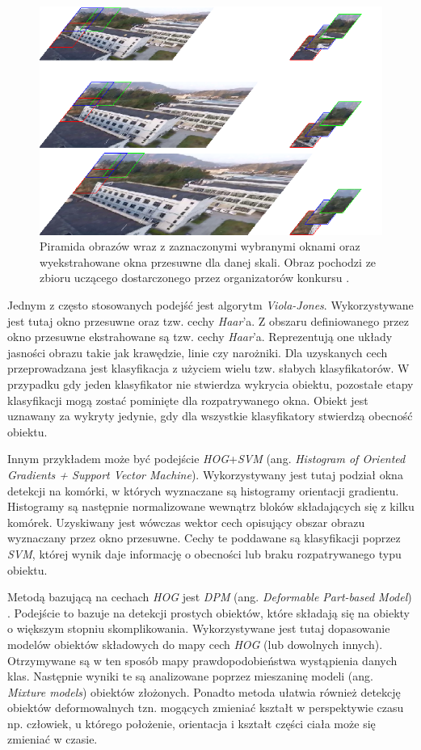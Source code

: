 \begin{figure}
    \centering
    \includegraphics[width=0.9\linewidth]{images/piramid.png}
    \caption{Piramida obrazów wraz z zaznaczonymi wybranymi oknami oraz wyekstrahowane okna przesuwne dla danej skali. Obraz pochodzi ze zbioru uczącego dostarczonego przez organizatorów konkursu \cite{dac_sdc_2021}.}
    \label{fig:sliding_window}
\end{figure}


Jednym z często stosowanych podejść jest algorytm \emph{Viola-Jones}\cite{viola_jones}. 
Wykorzystywane jest tutaj okno przesuwne oraz tzw. cechy \emph{Haar}'a.
Z obszaru definiowanego przez okno przesuwne ekstrahowane są tzw. cechy \emph{Haar}'a.
Reprezentują one układy jasności obrazu takie jak krawędzie, linie czy narożniki. 
Dla uzyskanych cech przeprowadzana jest klasyfikacja z użyciem wielu tzw. słabych klasyfikatorów.
W przypadku gdy jeden klasyfikator nie stwierdza wykrycia obiektu, pozostałe etapy klasyfikacji mogą zostać pominięte dla rozpatrywanego okna.
Obiekt jest uznawany za wykryty jedynie, gdy dla wszystkie klasyfikatory stwierdzą obecność obiektu. 

Innym przykładem może być podejście \emph{HOG}+\emph{SVM}\cite{hog} (ang. \emph{Histogram of Oriented Gradients + Support Vector Machine}). 
Wykorzystywany jest tutaj podział okna detekcji na komórki, w których wyznaczane są histogramy orientacji gradientu. 
Histogramy są następnie normalizowane wewnątrz bloków składających się z kilku komórek. 
Uzyskiwany jest wówczas wektor cech opisujący obszar obrazu wyznaczany przez okno przesuwne. 
Cechy te poddawane są klasyfikacji poprzez \emph{SVM}, której wynik daje informację o obecności lub braku rozpatrywanego typu obiektu.

Metodą bazującą na cechach \emph{HOG} jest \emph{DPM} (ang. \emph{Deformable Part-based Model}) \cite{model_based}.
Podejście to bazuje na detekcji prostych obiektów, które składają się na obiekty o większym stopniu skomplikowania.
Wykorzystywane jest tutaj dopasowanie modelów obiektów składowych do mapy cech \emph{HOG} (lub dowolnych innych).
Otrzymywane są w ten sposób mapy prawdopodobieństwa wystąpienia danych klas.
Następnie wyniki te są analizowane poprzez mieszaninę modeli (ang. \emph{Mixture models}) obiektów złożonych.
Ponadto metoda ułatwia również detekcję obiektów deformowalnych tzn. mogących zmieniać kształt w perspektywie czasu np. człowiek, u którego położenie, orientacja i kształt części ciała może się zmieniać w czasie.


